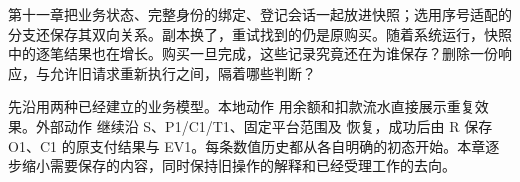 \newcommand{\CTwelveFigure}[3]{%
  \begin{figure}[htbp]
  \centering
  \begingroup
  \definecolor{Blue}{HTML}{315E76}
  \definecolor{Gold}{HTML}{A96B34}
  \tikzset{every node/.style={font=\small\sffamily,align=center},
    box/.style={draw=Blue,rounded corners=2pt,fill=blue!3,inner sep=6pt,
      text width=3.5cm,minimum height=.8cm},
    good/.style={box,draw=green!35!black,fill=green!4},
    warn/.style={box,draw=Gold,fill=orange!5},
    arr/.style={-{Stealth[length=2mm]},thick,draw=Blue},
    note/.style={font=\footnotesize\sffamily,align=center,text=black!75},
    lane/.style={draw=black!30,densely dashed},
    cell/.style={draw=Blue,minimum width=2.1cm,minimum height=.65cm,
      fill=blue!3,inner sep=3pt}}
  \resizebox{.98\linewidth}{!}{}
  \endgroup
  \caption{#2}\label{#3}
  \end{figure}}

第十一章把业务状态、完整身份的绑定、登记会话一起放进快照；选用序号适配的分支还保存其双向关系。副本换了，重试找到的仍是原购买。随着系统运行，快照中的逐笔结果也在增长。购买一旦完成，这些记录究竟还在为谁保存？删除一份响应，与允许旧请求重新执行之间，隔着哪些判断？

先沿用两种已经建立的业务模型。本地动作  用余额和扣款流水直接展示重复效果。外部动作  继续沿 S、P1/C1/T1、固定平台范围及  恢复，成功后由 R 保存 O1、C1 的原支付结果与 EV1。每条数值历史都从各自明确的初态开始。本章逐步缩小需要保存的内容，同时保持旧操作的解释和已经受理工作的去向。

